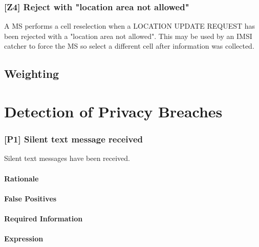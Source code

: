 \documentclass[a4paper,11pt,notitlepage,bigheadings,oneside]{scrartcl}
\begin{document}
\subsubsection{[Z4] Reject with "location area not allowed"}

A MS performs a cell reselection when a LOCATION UPDATE REQUEST has been
rejected with a "location area not allowed". This may be used by an IMSI
catcher to force the MS so select a different cell after information was
collected.


\subsection{Weighting}

\section{Detection of Privacy Breaches}
\label{sec:detection_of_privacy_breaches}

\subsubsection{[P1] Silent text message received}

Silent text messages have been received.

\paragraph{Rationale}

\TBD{}

\paragraph{False Positives}


\paragraph{Required Information}

\TBD{}

\paragraph{Expression}
\end{document}
